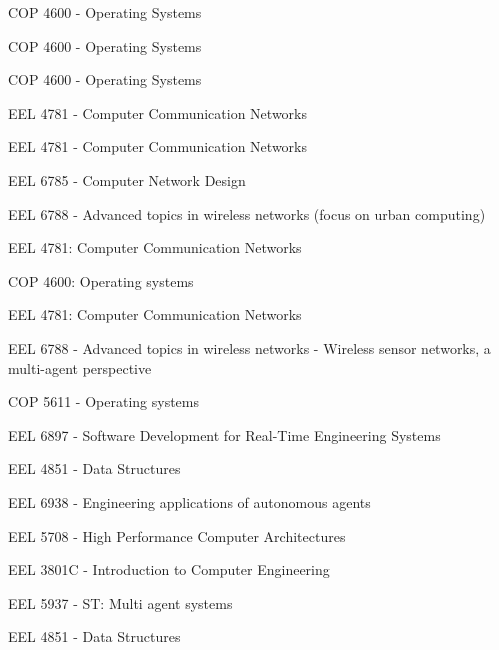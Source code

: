 COP 4600 - Operating Systems


COP 4600 - Operating Systems


COP 4600 - Operating Systems


EEL 4781 - Computer Communication Networks


EEL 4781 - Computer Communication Networks

EEL 6785 - Computer Network Design


EEL 6788 - Advanced topics in wireless networks (focus on urban computing)


EEL 4781: Computer Communication Networks


COP 4600: Operating systems


EEL 4781: Computer Communication Networks


EEL 6788 - Advanced topics in wireless networks - Wireless sensor networks, a multi-agent perspective


COP 5611 - Operating systems


EEL 6897 - Software Development for Real-Time Engineering Systems


EEL 4851 - Data Structures

EEL 6938 - Engineering applications of autonomous agents


EEL 5708 - High Performance Computer Architectures


EEL 3801C - Introduction to Computer Engineering


EEL 5937 - ST: Multi agent systems


EEL 4851 - Data Structures


